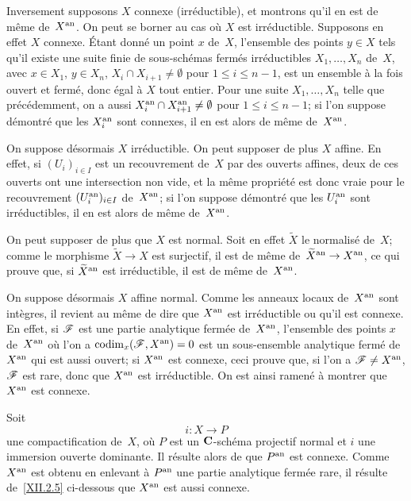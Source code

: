 Inversement supposons $X$ connexe (\resp irr\'eductible), et
montrons qu'il en est de m\^eme de~$X^{\mathrm{an}}$. On peut se borner au cas
o\`u $X$ est irr\'eductible. Supposons en effet $X$ connexe.
\'Etant donn\'e un point $x$ de~$X$, l'ensemble des points $y \in X$
tels qu'il existe une suite finie de sous-sch\'emas ferm\'es
irr\'eductibles $X_1, \dots, X_n$ de~$X$, avec $x \in X_1$, $y \in
X_n$, $X_i \cap X_{i+1} \neq \emptyset $ pour $1 \leq i \leq n-1$,
est un ensemble \`a la fois ouvert et ferm\'e, donc \'egal \`a
$X$ tout entier. Pour une suite $X_1, \dots, X_n$ telle que
pr\'ec\'edemment, on a aussi $X_{i}^{\mathrm{an}} \cap X_{i+1}^{\mathrm{an}} \neq
\emptyset $ pour $1 \leq i \leq n-1 $; si l'on suppose
d\'emontr\'e que les $X_{i}^{\mathrm{an}}$ sont connexes, il en est alors de
m\^eme de~$X^{\mathrm{an}}$.

On
suppose d\'esormais $X$ irr\'eductible. On peut supposer de plus
$X$ affine. En effet, si $(U_i)_{i \in I}$ est un recouvrement de~$X$
par des ouverts affines, deux de ces ouverts ont une intersection non
vide, et la m\^eme propri\'et\'e est donc vraie pour le
recouvrement $(U_{i}^{\mathrm{an}})_{i \in I} $ de~$X^{\mathrm{an}}$; si l'on suppose
d\'emontr\'e que les $U_{i}^{\mathrm{an}} $ sont irr\'eductibles, il en
est alors de m\^eme de~$X^{\mathrm{an}}$.

On peut supposer de plus que $X$ est normal. Soit en effet $\tilde X$
le normalis\'e de~$X$; comme le morphisme $\tilde X \to X$ est
surjectif, il est de m\^eme de~$\tilde X^\an \to X^\an$, ce qui
prouve que, si $\widetilde X^{\mathrm{an}} $ est irr\'eductible, il est de
m\^eme de~$X^{\mathrm{an}}$.

On suppose d\'esormais $X$ affine normal. Comme les anneaux locaux
de~$X^{\mathrm{an}}$ sont int\`egres, il revient au m\^eme de dire que
$X^{\mathrm{an}}$ est irr\'eductible ou qu'il est connexe. En effet, si
$\cal{F}$ est une partie analytique ferm\'ee de~$X^{\mathrm{an}}$, l'ensemble
des points $x$ de~$X^{\mathrm{an}}$ o\`u l'on a $\codim_x (\cal{F}, X^\an ) =
0$ est un sous-ensemble analytique ferm\'e de~$X^{\mathrm{an}}$ \cite[ A
Cor.\, 1]{XII.4} qui est aussi ouvert; si $X^{\mathrm{an}}$ est connexe, ceci prouve que,
si l'on a $\cal{F} \neq X^\an$, $\cal{F}$ est rare, donc que $X^{\mathrm{an}}$
est irr\'eductible. On est ainsi ramen\'e \`a montrer que
$X^{\mathrm{an}}$ est connexe.

Soit
$$
i \colon X \to P
$$
une compactification de~$X$, o\`u $P$ est un $\mathbf{C}$-sch\'ema
projectif normal et $i$ une immersion ouverte dominante. Il
r\'esulte alors de \cite[ th.\, 1]{XII.10} que $P^{\mathrm{an}}$ est connexe. Comme
$X^{\mathrm{an}}$ est obtenu en enlevant \`a $P^{\mathrm{an}}$ une partie analytique
ferm\'ee rare, il r\'esulte de~\ref{XII.2.5} ci-dessous que $X^{\mathrm{an}}$
est aussi connexe.

